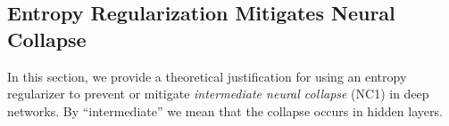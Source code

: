 





\subsection{Entropy Regularization Mitigates Neural Collapse}
\label{sec:entropy_and_collapse}

In this section, we provide a theoretical justification for using an entropy regularizer to prevent or mitigate \emph{intermediate neural collapse} (NC1) in deep networks. 
By ``intermediate'' we mean that the collapse occurs in hidden layers.


